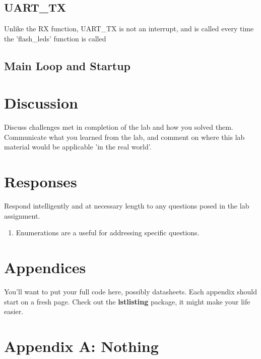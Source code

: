 \documentclass[letterpaper,11pt]{texMemo} %
\begin{document}
\subsection*{UART\_TX}
Unlike the RX function, UART\_TX is not an interrupt, and is called every time the 'flash\_leds' function is called 

\subsection*{Main Loop and Startup}

\section*{Discussion}
Discuss challenges met in completion of the lab and how you solved them. Communicate what you learned from the lab, and comment on where this lab material would be applicable 'in the real world'. 

\section*{Responses}
Respond intelligently and at necessary length to any questions posed in the lab assignment.
\begin{enumerate}
\item Enumerations are a useful for addressing specific questions.
\end{enumerate} 

\section*{Appendices}
You'll want to put your full code here, possibly datasheets. Each appendix should start on a fresh page. Check out the \textbf{lstlisting} package, it might make your life easier. 
\newpage

\section*{Appendix A: Nothing}

\end{document}
